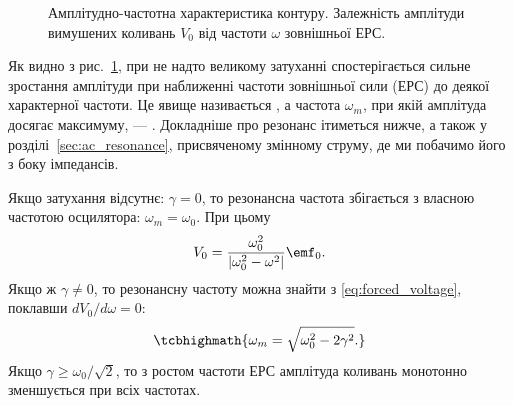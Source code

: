\begin{figure}[h!]
	\centering
	\caption{Амплітудно-частотна характеристика контуру. Залежність амплітуди вимушених коливань $V_0$ від частоти $\omega$ зовнішньої ЕРС.}
	\label{tikz:amplitude_response}
\end{figure}

Як видно з рис.~\ref{tikz:amplitude_response}, при не надто великому затуханні спостерігається сильне зростання амплітуди при наближенні частоти
зовнішньої сили (ЕРС) до деякої характерної частоти. Це явище
називається , а частота $\omega_m$, при якій амплітуда досягає
максимуму, --- . Докладніше про резонанс ітиметься нижче, а також у розділі~\ref{sec:ac_resonance}, присвяченому змінному струму, де ми побачимо його з боку імпедансів.

Якщо затухання відсутнє: $\gamma = 0$, то резонансна частота збігається з власною частотою осцилятора: $\omega_m = \omega_0$. При цьому
\begin{equation}\label{eq:resonance_no_damping}
	V_0 = \frac{\omega_0^2}{\left|\omega_0^2 - \omega^2\right|}\emf_0.
\end{equation}
Якщо ж $\gamma \neq 0$, то резонансну частоту можна знайти з \eqref{eq:forced_voltage}, поклавши
$dV_0/d\omega = 0$:
\begin{equation}\label{eq:resonance_frequency}
	\tcbhighmath{
		\omega_m = \sqrt{\omega_0^2 - 2\gamma^2}.
	}
\end{equation}
Якщо $\gamma \geq \omega_0/\sqrt{2}$, то з ростом частоти ЕРС амплітуда коливань монотонно зменшується при всіх частотах.


